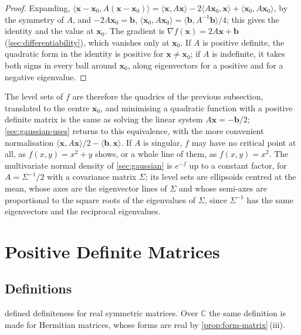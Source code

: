 \begin{proof}
Expanding, $\langle\mathbf x-\mathbf x_0,A(\mathbf x-\mathbf x_0)\rangle=\langle\mathbf x,A\mathbf x\rangle-2\langle A\mathbf x_0,\mathbf x\rangle+\langle\mathbf x_0,A\mathbf x_0\rangle$, by the symmetry of $A$, and $-2A\mathbf x_0=\mathbf b$, $\langle\mathbf x_0,A\mathbf x_0\rangle=\langle\mathbf b,A^{-1}\mathbf b\rangle/4$; this gives the identity and the value at $\mathbf x_0$. The gradient is $\nabla f(\mathbf x)=2A\mathbf x+\mathbf b$ (\cref{sec:differentiability}), which vanishes only at $\mathbf x_0$. If $A$ is positive definite, the quadratic form in the identity is positive for $\mathbf x\ne\mathbf x_0$; if $A$ is indefinite, it takes both signs in every ball around $\mathbf x_0$, along eigenvectors for a positive and for a negative eigenvalue.
\end{proof}

The level sets of $f$ are therefore the quadrics of the previous subsection, translated to the centre $\mathbf x_0$, and minimising a quadratic function with a positive definite matrix is the same as solving the linear system $A\mathbf x=-\mathbf b/2$; \cref{sec:gaussian-uses} returns to this equivalence, with the more convenient normalisation $\langle\mathbf x,A\mathbf x\rangle/2-\langle\mathbf b,\mathbf x\rangle$. If $A$ is singular, $f$ may have no critical point at all, as $f(x,y)=x^2+y$ shows, or a whole line of them, as $f(x,y)=x^2$. The multivariate normal density of \cref{sec:gaussian} is $e^{-f}$ up to a constant factor, for $A=\Sigma^{-1}/2$ with a covariance matrix $\Sigma$; its level sets are ellipsoids centred at the mean, whose axes are the eigenvector lines of $\Sigma$ and whose semi-axes are proportional to the square roots of the eigenvalues of $\Sigma$, since $\Sigma^{-1}$ has the same eigenvectors and the reciprocal eigenvalues.

\section{Positive Definite Matrices}
\label{sec:positive-definite}

\subsection{Definitions}

 defined definiteness for real symmetric matrices. Over $\mathbb C$ the same definition is made for Hermitian matrices, whose forms are real by \cref{prop:form-matrix}\,(iii).

